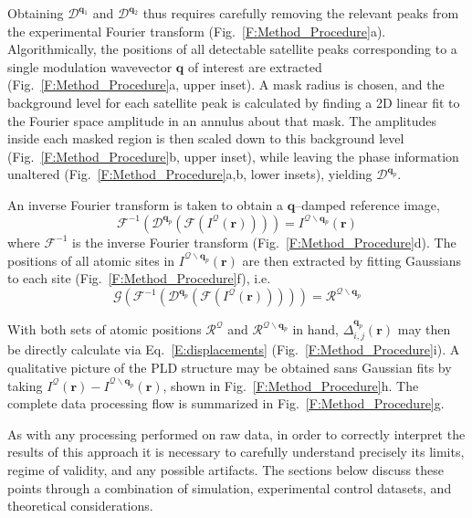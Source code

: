 \documentclass[12pt]{article}
\begin{document}
Obtaining $\mathcal{D}^{\mathbf{q}_1}$ and $\mathcal{D}^{\mathbf{q}_2}$ thus requires carefully removing the relevant peaks from the experimental Fourier transform (Fig.~\ref{F:Method_Procedure}a).
Algorithmically, the positions of all detectable satellite peaks corresponding to a single modulation wavevector $\mathbf{q}$ of interest are extracted (Fig.~\ref{F:Method_Procedure}a, upper inset).
A mask radius is chosen, and the background level for each satellite peak is calculated by finding a 2D linear fit to the Fourier space amplitude in an annulus about that mask.
The amplitudes inside each masked region is then scaled down to this background level (Fig.~\ref{F:Method_Procedure}b, upper inset), while leaving the phase information unaltered (Fig.~\ref{F:Method_Procedure}a,b, lower insets), yielding $\mathcal{D}^{\mathbf{q}_p}$.  

An inverse Fourier transform is taken to obtain a $\mathbf{q}$--damped reference image,
\begin{equation*}    \mathcal{F}^{-1}\left(\mathcal{D}^{\mathbf{q}_p}\left(\mathcal{F}\left(I^{\mathcal{Q}}(\mathbf{r})\right)\right)\right) = I^{\mathcal{Q}\backslash\mathbf{q}_p}(\mathbf{r})
\end{equation*}
where $\mathcal{F}^{-1}$ is the inverse Fourier transform (Fig.~\ref{F:Method_Procedure}d).
The positions of all atomic sites in $I^{\mathcal{Q}\backslash\mathbf{q}_p}(\mathbf{r})$ are then extracted by fitting Gaussians to each site (Fig.~\ref{F:Method_Procedure}f), i.e.
\begin{equation*}    \mathcal{G}\left(\mathcal{F}^{-1}\left(\mathcal{D}^{\mathbf{q}_p}\left(\mathcal{F}\left(I^{\mathcal{Q}}(\mathbf{r})\right)\right)\right)\right) = \mathcal{R}^{\mathcal{Q}\backslash\mathbf{q}_p}
\end{equation*}

With both sets of atomic positions $\mathcal{R}^{\mathcal{Q}}$ and $\mathcal{R}^{\mathcal{Q}\backslash\mathbf{q}_p}$ in hand, $\Delta^{\mathbf{q}_p}_{i,j}(\mathbf{r})$ may then be directly calculate via Eq.~\ref{E:displacements} (Fig.~\ref{F:Method_Procedure}i).
A qualitative picture of the PLD structure may be obtained sans Gaussian fits by taking $I^\mathcal{Q}(\mathbf{r}) - I^{\mathcal{Q}\backslash\mathbf{q}_p}(\mathbf{r})$, shown in Fig.~\ref{F:Method_Procedure}h.
The complete data processing flow is summarized in Fig.~\ref{F:Method_Procedure}g.


As with any processing performed on raw data, in order to correctly interpret the results of this approach it is necessary to carefully understand precisely its limits, regime of validity, and any possible artifacts. 
The sections below discuss these points through a combination of simulation, experimental control datasets, and theoretical considerations.
\end{document}
